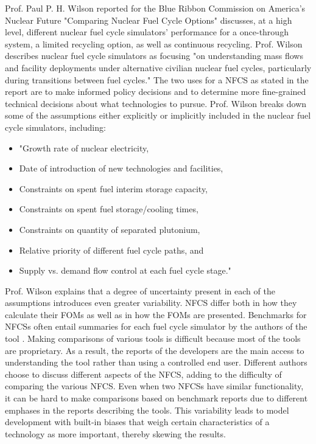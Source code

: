 \documentclass[12pt]{UIdahoMastersThesis}
\begin{document}
Prof. Paul P. H. Wilson reported for the Blue Ribbon Commission on America's Nuclear Future "Comparing Nuclear Fuel Cycle Options" discusses, at a high level, different nuclear fuel cycle simulators' performance for a once-through system, a limited recycling option, as well as continuous recycling. Prof. Wilson describes nuclear fuel cycle simulators as focusing "on understanding mass flows and facility deployments under alternative civilian nuclear fuel cycles, particularly during transitions between fuel cycles." The two uses for a NFCS as stated in the report are to make informed policy decisions and to determine more fine-grained technical decisions about what technologies to pursue. Prof. Wilson breaks down some of the assumptions either explicitly or implicitly included in the nuclear fuel cycle simulators, including:
\begin{itemize}
\item "Growth rate of nuclear electricity, 
\item Date of introduction of new technologies and facilities, 
\item Constraints on spent fuel interim storage capacity, 
\item Constraints on spent fuel storage/cooling times,
\item Constraints on quantity of separated plutonium, 
\item Relative priority of different fuel cycle paths, and 
\item Supply vs. demand flow control at each fuel cycle stage."
\end{itemize}

Prof. Wilson explains that a degree of uncertainty present in each of the assumptions introduces even greater variability. NFCS differ both in how they calculate their FOMs as well as in how the FOMs are presented. Benchmarks for NFCSs often entail summaries for each fuel cycle simulator by the authors of the tool \cite{Guerin2009}. Making comparisons of various tools is difficult because most of the tools are proprietary. As a result, the reports of the developers are the main access to understanding the tool rather than using a controlled end user. Different authors choose to discuss different aspects of the NFCS, adding to the difficulty of comparing the various NFCS. Even when two NFCSs have similar functionality, it can be hard to make comparisons based on benchmark reports due to different emphases in the reports describing the tools. This variability leads to model development with built-in biases that weigh certain characteristics of a technology as more important, thereby skewing the results. 
\end{document}
